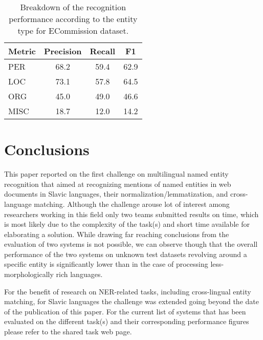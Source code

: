 \documentclass[11pt]{article}
\begin{document}
\begin{table}
  \begin{center}
    \begin{footnotesize}
      \begin{tabular}{lccc}
        \toprule 
        Metric & \textbf{Precision} & \textbf{Recall} & \textbf{F1} \\
        \midrule
        PER & 68.2 & 59.4 & 62.9 \\
        LOC & 73.1 & 57.8 & 64.5 \\
        ORG & 45.0 & 49.0 & 46.6 \\
        MISC & 18.7 & 12.0 & 14.2 \\
        \bottomrule
      \end{tabular}
    \end{footnotesize}
  \end{center}
  \caption{Breakdown of the recognition performance according to the entity type for {\sc ECommission} dataset.}
  \label{tab:recognition-breakdown-ec}
\end{table}

\section{Conclusions}
\label{sec:conclusions}


This paper reported on the first challenge on multilingual named entity recognition that aimed at recognizing 
mentions of named entities in web documents in Slavic languages, their normalization/lemmatization, and 
cross-language matching. Although the challenge arouse lot of interest among researchers working 
in this field only two teams submitted results on time, which is most likely due to the complexity
of the task(s) and short time available for elaborating a solution. While drawing far reaching
conclusions from the evaluation of two systems is not possible, we can observe though that 
the overall performance of the two systems on unknown test datasets revolving around a specific entity
is significantly lower than in the case of processing less-morphologically rich languages. 

For the benefit of research on NER-related tasks, including cross-lingual entity matching, for Slavic
languages the challenge was extended going beyond the date of the publication of this paper. For the current 
list of systems that has been evaluated on the different task(s) and their corresponding performance figures
please refer to the shared task web page. 
\end{document}
